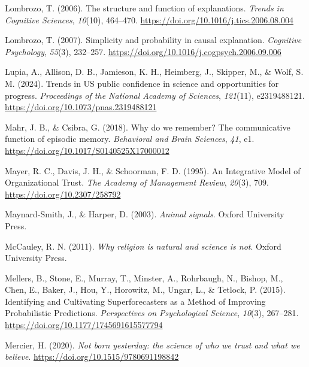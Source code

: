 \documentclass[
  jou,
  floatsintext,
  longtable,
  nolmodern,
  notxfonts,
  notimes,
  colorlinks=true,linkcolor=blue,citecolor=blue,urlcolor=blue]{apa7}
\newlength{\cslhangindent}
\newenvironment{CSLReferences}[2] %
 {\begin{list}{}{%
  \setlength{\itemindent}{0pt}
  \setlength{\leftmargin}{0pt}
  \setlength{\parsep}{0pt}
  \ifodd #1
   \setlength{\leftmargin}{\cslhangindent}
   \setlength{\itemindent}{-1\cslhangindent}
  \fi
  \setlength{\itemsep}{#2\baselineskip}}}
 {\end{list}}
\begin{document}
\begin{CSLReferences}{1}{0}
Lombrozo, T. (2006). The structure and function of explanations.
\emph{Trends in Cognitive Sciences}, \emph{10}(10), 464--470.
\url{https://doi.org/10.1016/j.tics.2006.08.004}

Lombrozo, T. (2007). Simplicity and probability in causal explanation.
\emph{Cognitive Psychology}, \emph{55}(3), 232--257.
\url{https://doi.org/10.1016/j.cogpsych.2006.09.006}

Lupia, A., Allison, D. B., Jamieson, K. H., Heimberg, J., Skipper, M.,
\& Wolf, S. M. (2024). Trends in US public confidence in science and
opportunities for progress. \emph{Proceedings of the National Academy of
Sciences}, \emph{121}(11), e2319488121.
\url{https://doi.org/10.1073/pnas.2319488121}

Mahr, J. B., \& Csibra, G. (2018). Why do we remember? The communicative
function of episodic memory. \emph{Behavioral and Brain Sciences},
\emph{41}, e1. \url{https://doi.org/10.1017/S0140525X17000012}

Mayer, R. C., Davis, J. H., \& Schoorman, F. D. (1995). An Integrative
Model of Organizational Trust. \emph{The Academy of Management Review},
\emph{20}(3), 709. \url{https://doi.org/10.2307/258792}

Maynard-Smith, J., \& Harper, D. (2003). \emph{Animal signals}. Oxford
University Press.

McCauley, R. N. (2011). \emph{Why religion is natural and science is
not}. Oxford University Press.

Mellers, B., Stone, E., Murray, T., Minster, A., Rohrbaugh, N., Bishop,
M., Chen, E., Baker, J., Hou, Y., Horowitz, M., Ungar, L., \& Tetlock,
P. (2015). Identifying and Cultivating Superforecasters as a Method of
Improving Probabilistic Predictions. \emph{Perspectives on Psychological
Science}, \emph{10}(3), 267--281.
\url{https://doi.org/10.1177/1745691615577794}

Mercier, H. (2020). \emph{Not born yesterday: the science of who we
trust and what we believe}. \url{https://doi.org/10.1515/9780691198842}


\end{CSLReferences}
\end{document}
